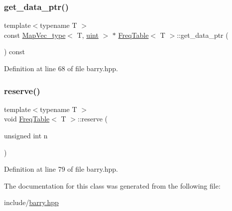 \subsubsection{\texorpdfstring{get\+\_\+data\+\_\+ptr()}{get\_data\_ptr()}}
{\footnotesize\ttfamily template$<$typename T $>$ \\
const \hyperlink{namespacebarry_a2f0d3aab1d67e4c8eaeab9022e16139f}{Map\+Vec\+\_\+type}$<$ T, \hyperlink{namespacebarry_a11dfc53ddb4672278319aa04f1e09a6c}{uint} $>$ $\ast$ \hyperlink{classbarry_1_1_freq_table}{Freq\+Table}$<$ T $>$\+::get\+\_\+data\+\_\+ptr (\begin{DoxyParamCaption}{ }\end{DoxyParamCaption}) const\hspace{0.3cm}{\ttfamily [inline]}}



Definition at line 68 of file barry.\+hpp.

\mbox{\label{classbarry_1_1_freq_table_a0bdced25f7c0bee38e073c4654578d19}} 
\subsubsection{\texorpdfstring{reserve()}{reserve()}}
{\footnotesize\ttfamily template$<$typename T $>$ \\
void \hyperlink{classbarry_1_1_freq_table}{Freq\+Table}$<$ T $>$\+::reserve (\begin{DoxyParamCaption}\item[{unsigned int}]{n }\end{DoxyParamCaption})\hspace{0.3cm}{\ttfamily [inline]}}



Definition at line 79 of file barry.\+hpp.



The documentation for this class was generated from the following file\+:\begin{DoxyCompactItemize}
\item 
include/\hyperlink{barry_8hpp}{barry.\+hpp}\end{DoxyCompactItemize}
